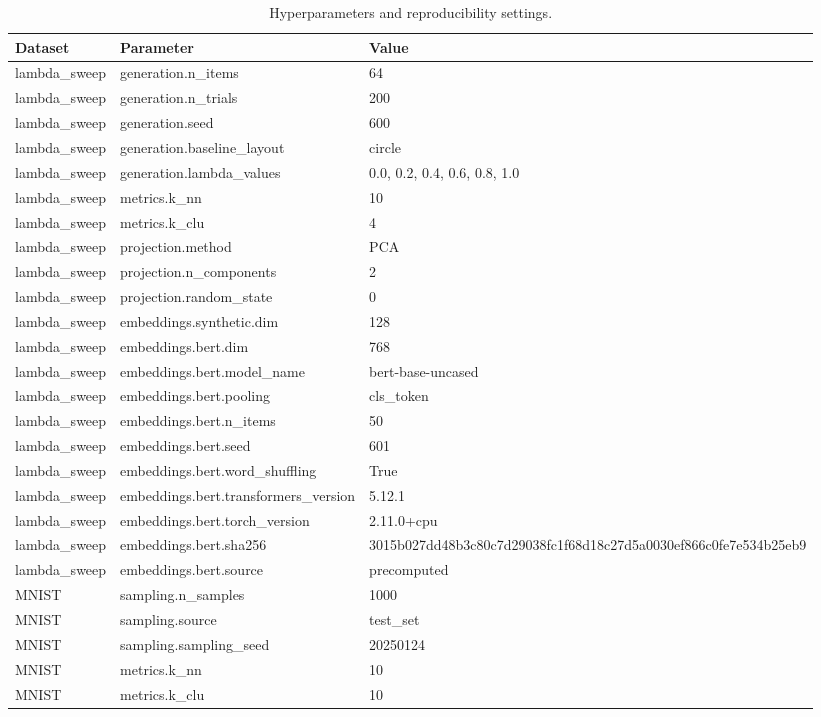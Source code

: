 \begin{table}[h]
\centering
\caption{Hyperparameters and reproducibility settings.}
\begin{tabular}{lll}
\toprule
Dataset & Parameter & Value \\
\midrule
lambda\_sweep & generation.n\_items & 64 \\
lambda\_sweep & generation.n\_trials & 200 \\
lambda\_sweep & generation.seed & 600 \\
lambda\_sweep & generation.baseline\_layout & circle \\
lambda\_sweep & generation.lambda\_values & 0.0, 0.2, 0.4, 0.6, 0.8, 1.0 \\
lambda\_sweep & metrics.k\_nn & 10 \\
lambda\_sweep & metrics.k\_clu & 4 \\
lambda\_sweep & projection.method & PCA \\
lambda\_sweep & projection.n\_components & 2 \\
lambda\_sweep & projection.random\_state & 0 \\
lambda\_sweep & embeddings.synthetic.dim & 128 \\
lambda\_sweep & embeddings.bert.dim & 768 \\
lambda\_sweep & embeddings.bert.model\_name & bert-base-uncased \\
lambda\_sweep & embeddings.bert.pooling & cls\_token \\
lambda\_sweep & embeddings.bert.n\_items & 50 \\
lambda\_sweep & embeddings.bert.seed & 601 \\
lambda\_sweep & embeddings.bert.word\_shuffling & True \\
lambda\_sweep & embeddings.bert.transformers\_version & 5.12.1 \\
lambda\_sweep & embeddings.bert.torch\_version & 2.11.0+cpu \\
lambda\_sweep & embeddings.bert.sha256 & 3015b027dd48b3c80c7d29038fc1f68d18c27d5a0030ef866c0fe7e534b25eb9 \\
lambda\_sweep & embeddings.bert.source & precomputed \\
MNIST & sampling.n\_samples & 1000 \\
MNIST & sampling.source & test\_set \\
MNIST & sampling.sampling\_seed & 20250124 \\
MNIST & metrics.k\_nn & 10 \\
MNIST & metrics.k\_clu & 10 \\

\end{tabular}
\end{table}
